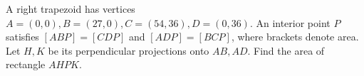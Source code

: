 A right trapezoid has vertices $ A=(0,0),B=(27,0),C=(54,36),D=(0,36)$. An interior point $ P $ satisfies $[ABP]=[CDP]$ and $[ADP]=[BCP]$, where brackets denote area. Let $ H,K $ be its perpendicular projections onto $ AB,AD $. Find the area of rectangle $ AHPK $.
